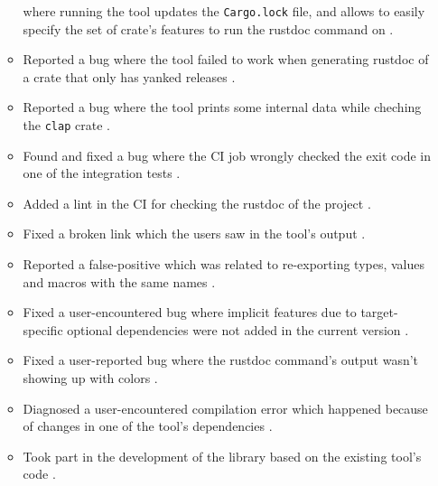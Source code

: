 \documentclass[licencjacka,en]{pracamgr}
\begin{document}
\begin{itemize}
\begin{itemize}
				where running the tool updates the \texttt{Cargo.lock} file,
				and allows to easily specify the set of crate's features to run the rustdoc command on
				\cite{pr_placeholder_1} \cite{pr_placeholder_2} \cite{pr_placeholder_3}
				\cite{pr_placeholder_4} \cite{pr_placeholder_5} \cite{pr_placeholder_6}.
			\item Reported a bug where the tool failed to work when
				generating rustdoc of a crate that only has yanked releases \cite{issue_fails_yanked}.
			\item Reported a bug where the tool prints some internal data
				while cheching the \texttt{clap} crate \cite{issue_internal_data}.
			\item Found and fixed a bug where the CI job wrongly checked
				the exit code in one of the integration tests \cite{pr_exit_code}.
			\item Added a lint in the CI for checking the rustdoc of the project \cite{pr_ci_rustdoc}.
			\item Fixed a broken link which the users saw in the tool's output \cite{pr_broken_link}.
			\item Reported a false-positive which was related to re-exporting types, values and macros
				with the same names \cite{issue_reexporting}.
			\item Fixed a user-encountered bug where implicit features due to target-specific
				optional dependencies were not added in the current version \cite{pr_false_positive_target_specific}.
			\item Fixed a user-reported bug \cite{issue_color_always}
				where the rustdoc command's output wasn't showing up with colors \cite{pr_color_always}.
			\item Diagnosed a user-encountered compilation error which happened
				because of changes in one of the tool's dependencies \cite{issue_compiling_fails}.
			\item Took part in the development of the library based on the existing tool's code \cite{pr_library}.
		\end{itemize}


\end{itemize}
\end{document}
